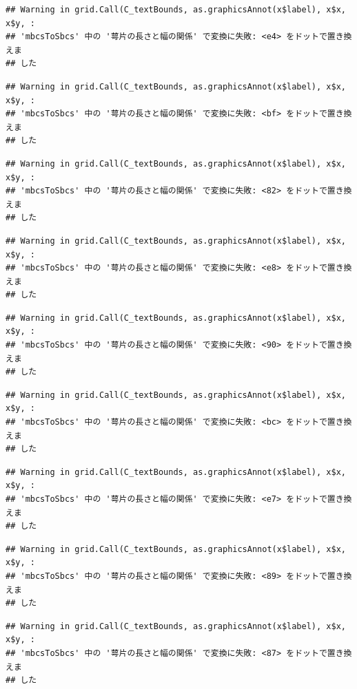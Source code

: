 \documentclass[
]{book}
\begin{document}
\begin{verbatim}
## Warning in grid.Call(C_textBounds, as.graphicsAnnot(x$label), x$x, x$y, :
## 'mbcsToSbcs' 中の '萼片の長さと幅の関係' で変換に失敗: <e4> をドットで置き換えま
## した
\end{verbatim}

\begin{verbatim}
## Warning in grid.Call(C_textBounds, as.graphicsAnnot(x$label), x$x, x$y, :
## 'mbcsToSbcs' 中の '萼片の長さと幅の関係' で変換に失敗: <bf> をドットで置き換えま
## した
\end{verbatim}

\begin{verbatim}
## Warning in grid.Call(C_textBounds, as.graphicsAnnot(x$label), x$x, x$y, :
## 'mbcsToSbcs' 中の '萼片の長さと幅の関係' で変換に失敗: <82> をドットで置き換えま
## した
\end{verbatim}

\begin{verbatim}
## Warning in grid.Call(C_textBounds, as.graphicsAnnot(x$label), x$x, x$y, :
## 'mbcsToSbcs' 中の '萼片の長さと幅の関係' で変換に失敗: <e8> をドットで置き換えま
## した
\end{verbatim}

\begin{verbatim}
## Warning in grid.Call(C_textBounds, as.graphicsAnnot(x$label), x$x, x$y, :
## 'mbcsToSbcs' 中の '萼片の長さと幅の関係' で変換に失敗: <90> をドットで置き換えま
## した
\end{verbatim}

\begin{verbatim}
## Warning in grid.Call(C_textBounds, as.graphicsAnnot(x$label), x$x, x$y, :
## 'mbcsToSbcs' 中の '萼片の長さと幅の関係' で変換に失敗: <bc> をドットで置き換えま
## した
\end{verbatim}

\begin{verbatim}
## Warning in grid.Call(C_textBounds, as.graphicsAnnot(x$label), x$x, x$y, :
## 'mbcsToSbcs' 中の '萼片の長さと幅の関係' で変換に失敗: <e7> をドットで置き換えま
## した
\end{verbatim}

\begin{verbatim}
## Warning in grid.Call(C_textBounds, as.graphicsAnnot(x$label), x$x, x$y, :
## 'mbcsToSbcs' 中の '萼片の長さと幅の関係' で変換に失敗: <89> をドットで置き換えま
## した
\end{verbatim}

\begin{verbatim}
## Warning in grid.Call(C_textBounds, as.graphicsAnnot(x$label), x$x, x$y, :
## 'mbcsToSbcs' 中の '萼片の長さと幅の関係' で変換に失敗: <87> をドットで置き換えま
## した
\end{verbatim}
\end{document}
